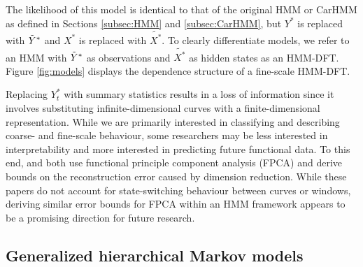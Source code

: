The likelihood of this model is identical to that of the original HMM or CarHMM as defined in Sections \ref{subsec:HMM} and \ref{subsec:CarHMM}, but $Y^*$ is replaced with $\tilde{Y}^*$ and $X^*$ is replaced with $\tilde{X^*}$. To clearly differentiate models, we refer to an HMM with $\tilde{Y}^*$ as observations and $\tilde{X^*}$ as hidden states as an HMM-DFT. Figure \ref{fig:models} displays the dependence structure of a fine-scale HMM-DFT.

Replacing $Y^*_t$ with summary statistics results in a loss of information since it involves substituting infinite-dimensional curves with a finite-dimensional representation. While we are primarily interested in classifying and describing coarse- and fine-scale behaviour, some researchers may be less interested in interpretability and more interested in predicting future functional data. To this end, \citet{Aue:2015} and \citet{Gao:2019} both use functional principle component analysis (FPCA) and derive bounds on the reconstruction error caused by dimension reduction. While these papers do not account for state-switching behaviour between curves or windows, deriving similar error bounds for FPCA within an HMM framework appears to be a promising direction for future research. 

\subsection{Generalized hierarchical Markov models}

